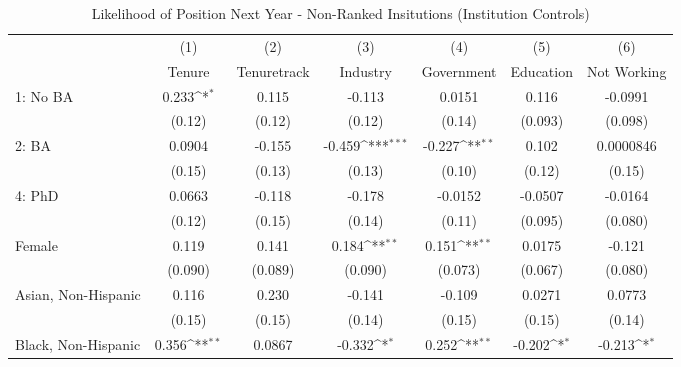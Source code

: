 \begin{table}[htbp]\centering
\def\sym#1{\ifmmode^{#1}\else\(^{#1}\)\fi}
\caption{Likelihood of Position Next Year - Non-Ranked Insitutions (Institution Controls)\label{tab2\_tenure}}
\begin{tabular}{l*{6}{c}}
\hline\hline
  &\multicolumn{1}{c}{(1)}&\multicolumn{1}{c}{(2)}&\multicolumn{1}{c}{(3)}&\multicolumn{1}{c}{(4)}&\multicolumn{1}{c}{(5)}&\multicolumn{1}{c}{(6)}\\
  &\multicolumn{1}{c}{Tenure}&\multicolumn{1}{c}{Tenuretrack}&\multicolumn{1}{c}{Industry}&\multicolumn{1}{c}{Government}&\multicolumn{1}{c}{Education}&\multicolumn{1}{c}{Not Working}\\
\hline
1: No BA&       0.233\sym{*}  &       0.115         &      -0.113         &      0.0151         &       0.116         &     -0.0991         \\
  &      (0.12)         &      (0.12)         &      (0.12)         &      (0.14)         &     (0.093)         &     (0.098)         \\
[1em]
2: BA&      0.0904         &      -0.155         &      -0.459\sym{***}&      -0.227\sym{**} &       0.102         &   0.0000846         \\
  &      (0.15)         &      (0.13)         &      (0.13)         &      (0.10)         &      (0.12)         &      (0.15)         \\
[1em]
4: PhD&      0.0663         &      -0.118         &      -0.178         &     -0.0152         &     -0.0507         &     -0.0164         \\
  &      (0.12)         &      (0.15)         &      (0.14)         &      (0.11)         &     (0.095)         &     (0.080)         \\
[1em]
Female&       0.119         &       0.141         &       0.184\sym{**} &       0.151\sym{**} &      0.0175         &      -0.121         \\
  &     (0.090)         &     (0.089)         &     (0.090)         &     (0.073)         &     (0.067)         &     (0.080)         \\
[1em]
Asian, Non-Hispanic&       0.116         &       0.230         &      -0.141         &      -0.109         &      0.0271         &      0.0773         \\
  &      (0.15)         &      (0.15)         &      (0.14)         &      (0.15)         &      (0.15)         &      (0.14)         \\
[1em]
Black, Non-Hispanic&       0.356\sym{**} &      0.0867         &      -0.332\sym{*}  &       0.252\sym{**} &      -0.202\sym{*}  &      -0.213\sym{*}  \\

\end{tabular}
\end{table}
